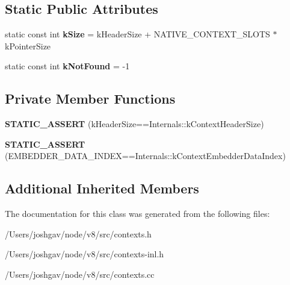 \subsection*{Static Public Attributes}
\begin{DoxyCompactItemize}
\item 
static const int {\bfseries k\+Size} = k\+Header\+Size + N\+A\+T\+I\+V\+E\+\_\+\+C\+O\+N\+T\+E\+X\+T\+\_\+\+S\+L\+O\+TS $\ast$ k\+Pointer\+Size\hypertarget{classv8_1_1internal_1_1_context_a52fad0297ec32fa9316e57396873d347}{}\label{classv8_1_1internal_1_1_context_a52fad0297ec32fa9316e57396873d347}

\item 
static const int {\bfseries k\+Not\+Found} = -\/1\hypertarget{classv8_1_1internal_1_1_context_adb2003ecea70022b97b810c1e77b8344}{}\label{classv8_1_1internal_1_1_context_adb2003ecea70022b97b810c1e77b8344}

\end{DoxyCompactItemize}
\subsection*{Private Member Functions}
\begin{DoxyCompactItemize}
\item 
{\bfseries S\+T\+A\+T\+I\+C\+\_\+\+A\+S\+S\+E\+RT} (k\+Header\+Size==Internals\+::k\+Context\+Header\+Size)\hypertarget{classv8_1_1internal_1_1_context_aca67609c60ebe09bd31d716337b5b7e7}{}\label{classv8_1_1internal_1_1_context_aca67609c60ebe09bd31d716337b5b7e7}

\item 
{\bfseries S\+T\+A\+T\+I\+C\+\_\+\+A\+S\+S\+E\+RT} (E\+M\+B\+E\+D\+D\+E\+R\+\_\+\+D\+A\+T\+A\+\_\+\+I\+N\+D\+EX==Internals\+::k\+Context\+Embedder\+Data\+Index)\hypertarget{classv8_1_1internal_1_1_context_a38d449cee57c9a9fc07b2994a8fe0956}{}\label{classv8_1_1internal_1_1_context_a38d449cee57c9a9fc07b2994a8fe0956}

\end{DoxyCompactItemize}
\subsection*{Additional Inherited Members}


The documentation for this class was generated from the following files\+:\begin{DoxyCompactItemize}
\item 
/\+Users/joshgav/node/v8/src/contexts.\+h\item 
/\+Users/joshgav/node/v8/src/contexts-\/inl.\+h\item 
/\+Users/joshgav/node/v8/src/contexts.\+cc\end{DoxyCompactItemize}
